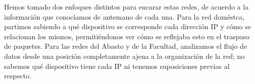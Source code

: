Hemos tomado dos enfoques distintos para encarar estas redes, de acuerdo a la información que conocíamos de antemano de cada una. Para la red 
doméstca, partimos sabiendo a qué dispositivo se corresponde cada dirección IP y cómo se relacionan los mismos, permitiéndonos ver cómo se reflejaba 
esto en el traspaso de paquetes. Para las redes del Abasto y de la Facultad, analizamos el flujo de datos desde una posición completamente ajena 
a la organización de la red; no sabemos qué dispositivo tiene cada IP ni tenemos suposiciones previas al respecto. 




